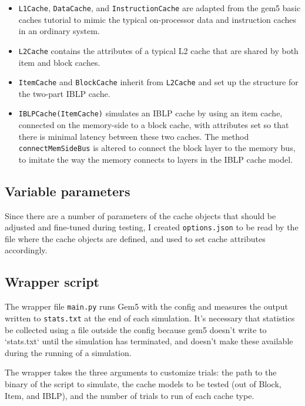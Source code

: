 \documentclass[12pt,twoside]{reedthesis}
\begin{document}
	\begin{itemize}
		\item \verb`L1Cache`, \verb`DataCache`, and \verb`InstructionCache` are adapted from the gem5 basic caches tutorial to mimic the typical on-processor data and instruction caches in an ordinary system.
	
		\item \verb`L2Cache` contains the attributes of a typical L2 cache that are shared by both item and block caches.
	
		\item \verb`ItemCache` and \verb`BlockCache` inherit from \verb`L2Cache` and set up the structure for the two-part IBLP cache.
	
		\item \verb`IBLPCache(ItemCache)` simulates an IBLP cache by using an item cache, connected on the memory-side to a block cache, with attributes set so that there is minimal latency between these two caches. The method \verb`connectMemSideBus` is altered to connect the block layer to the memory bus, to imitate the way the memory connects to layers in the IBLP cache model.
	\end{itemize}

	\subsection*{Variable parameters}

	Since there are a number of parameters of the cache objects that should be adjusted and fine-tuned during testing, I created \verb`options.json` to be read by the file where the cache objects are defined, and used to set cache attributes accordingly.

	\subsection*{Wrapper script}

	The wrapper file \verb`main.py` runs Gem5 with the config and measures the output written to \verb`stats.txt` at the end of each simulation. It's necessary that statistics be collected using a file outside the config because gem5 doesn't write to `stats.txt` until the simulation has terminated, and doesn't make these available during the running of a simulation.

	The wrapper takes the three arguments to customize trials: the path to the binary of the script to simulate, the cache models to be tested (out of Block, Item, and IBLP), and the number of trials to run of each cache type.
\end{document}
